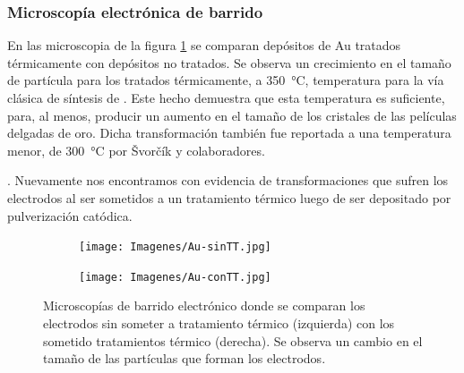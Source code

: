 {    	\subsubsection{Microscopía electrónica de barrido}
			  		
			 En las microscopia de la figura \ref{fig:Au_compTT} se comparan depósitos de Au tratados térmicamente con depósitos no tratados. Se observa un crecimiento en el tamaño de partícula para los tratados térmicamente, a \SI{350}{\celsius}, temperatura para la vía clásica de síntesis de \pdm. Este hecho demuestra que esta temperatura es suficiente, para, al menos, producir un aumento en el tamaño de los cristales de las películas delgadas de oro. Dicha transformación también fue reportada a una temperatura menor, de \SI{300}{\celsius} por \v{S}vor\v{c}\'ik y colaboradores.}\cite{Svorcik2010}. Nuevamente nos encontramos con evidencia de transformaciones que sufren los electrodos al ser sometidos a un tratamiento térmico luego de ser depositado por pulverización catódica.

			 		\begin{figure}[th]
		 	   	    \begin{subfigure}[t]{0.49\textwidth}
			       	\texttt{[image: Imagenes/Au-sinTT.jpg]}
			   		\end{subfigure}
			   		\begin{subfigure}[t]{0.49\textwidth}
			   	    \texttt{[image: Imagenes/Au-conTT.jpg]}
			   		\end{subfigure}
					 \caption[Microscopía comparativa electrodos Au]{Microscopías de barrido electrónico donde se comparan los electrodos sin someter a tratamiento térmico (izquierda) con los sometido tratamientos térmico (derecha). Se observa un cambio en el tamaño de las partículas que forman los electrodos.}
					 \label{fig:Au_compTT}	
				     \end{figure}
		 		 		



